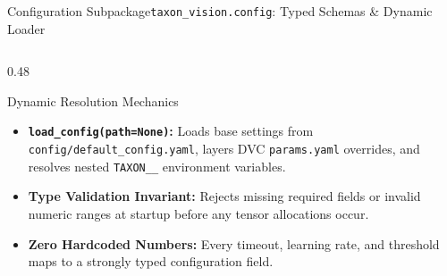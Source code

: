 \begin{frame}{Configuration Subpackage}{\texttt{taxon\_vision.config}: Typed Schemas \& Dynamic Loader}
\begin{columns}[T]
\begin{column}{0.48\textwidth}
\begin{block}{Dynamic Resolution Mechanics}
\begin{itemize}
                    \item \textbf{\texttt{load\_config(path=None)}:}
                        Loads base settings from \texttt{config/default\_config.yaml}, layers DVC \texttt{params.yaml} overrides, and resolves nested \texttt{TAXON\_\_} environment variables.
                    \item \textbf{Type Validation Invariant:}
                        Rejects missing required fields or invalid numeric ranges at startup before any tensor allocations occur.
                    \item \textbf{Zero Hardcoded Numbers:}
                        Every timeout, learning rate, and threshold maps to a strongly typed configuration field.
                \end{itemize}
            \end{block}
        \end{column}
    \end{columns}


\end{frame}

